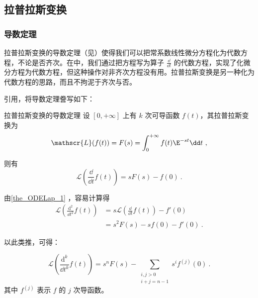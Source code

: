 

\subsection{拉普拉斯变换}

\subsubsection{导数定理}

拉普拉斯变换的导数定理（见）使得我们可以把常系数线性微分方程化为代数方程，不论是否齐次。在中，我们通过把方程写为算子 $\frac{\dd }{\dd t}$ 的代数方程，实现了化微分方程为代数方程，但这种操作对非齐次方程没有用。拉普拉斯变换是另一种化为代数方程的思路，而且不拘泥于齐次与否。

引用，将导数定理誊写如下：
\begin{theorem}{拉普拉斯变换的导数定理}\label{the_ODELap_1}
设 $[0, +\infty]$ 上有 $k$ 次可导函数 $f(t)$，其拉普拉斯变换为
\begin{equation}
\mathscr{L}(f(t))=F(s)=\int^{+\infty}_0f(t)\E^{-st}\dd t~,
\end{equation}

则有
\begin{equation}
\mathscr{L}(\frac{\dd}{\dd t}f(t))=sF(s)-f(0)~.
\end{equation}
\end{theorem}

由\autoref{the_ODELap_1} ，容易计算得
\begin{equation}
\begin{aligned}
\mathscr{L}(\frac{\mathrm{d}^2}{\dd t^2}f(t))&=s\mathscr{L}(\frac{\dd}{\dd t}f(t))-f'(0)\\
&=s^2F(s)-sf(0)-f'(0)~.
\end{aligned}
\end{equation}

以此类推，可得：

\begin{corollary}{}\label{cor_ODELap_1}
\begin{equation}
\mathscr{L}(\frac{\mathrm{d}^k}{\dd t^k}f(t))=s^nF(s)-\sum_{\substack{i, j>0\\   i+j=n-1}}s^if^{(j)}(0)~.
\end{equation}
其中 $f^{(j)}$ 表示 $f$ 的 $j$ 次导函数。



\end{corollary}




